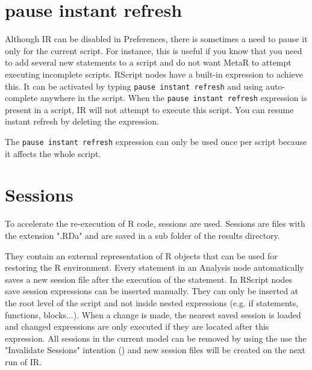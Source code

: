 \section{pause instant refresh}
Although IR can be disabled in Preferences, there is sometimes a need to pause it only for the current script. For instance, this is useful if you know that you need to add several new statements to a script and do not want MetaR to attempt executing incomplete scripts. RScript nodes have
a built-in expression to achieve this. It can be activated by typing \texttt{pause instant refresh} and using auto-complete anywhere in the script. When the \texttt{pause instant refresh} expression is present in a script, IR will not attempt to execute this script. You can resume instant refresh by deleting the expression.

\begin{remark}
The \texttt{pause instant refresh} expression can only be used once per script because it affects the whole script.
\end{remark}

\section{Sessions}
To accelerate the re-execution of R code, sessions are used. Sessions are files with the extension ".RDa" and are saved in a sub folder of the results directory.

They contain an external representation of R objects that can be used for restoring the R environment. Every statement in an Analysis node automatically saves a new session file after the execution of the statement. In RScript nodes save session expressions can be inserted manually. They can only be inserted at the root level of the script and not inside nested expressions (e.g. if statements, functions, blocks...). When a change is made, the nearest saved session is loaded and changed expressions are only executed if they are located after this expression. All sessions in the current model can be removed by using the use the "Invalidate Sessions" intention (\intentionLightBulb)  and new session files will be created on the next run of IR.
 
